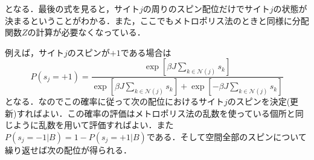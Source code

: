 \documentclass[a4paper,11pt]{jsarticle}
\begin{document}
となる．最後の式を見ると，サイト$j$の周りのスピン配位だけでサイト$j$の状態が決まるということがわかる．また，ここでもメトロポリス法のときと同様に分配関数$Z$の計算が必要なくなっている．\par
例えば，サイト$j$のスピンが$+1$である場合は
\begin{equation}
  P(s_j = +1)
  = \frac{\exp{\left[\beta J \sum_{k \in \mathcal{N}(j)}s_k\right]}}{\exp{\left[\beta J \sum_{k \in \mathcal{N}(j)}s_k\right]} + \exp{\left[-\beta J \sum_{k \in \mathcal{N}(j)}s_k\right]}}
\end{equation}
となる．なのでこの確率に従って次の配位におけるサイト$j$のスピンを決定(更新)すればよい．この確率の評価はメトロポリス法の乱数を使っている個所と同じように乱数を用いて評価すればよい．また$P(s_j = -1|B) = 1 - P(s_j =+1|B)$である．そして空間全部のスピンについて繰り返せば次の配位が得られる．
\end{document}
